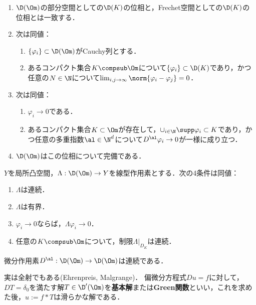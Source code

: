 \documentclass[uplatex,dvipdfmx]{jsreport}
\begin{document}
\begin{theorem}\mbox{}
    \begin{enumerate}
        \item $\D(\Om)$の部分空間としての$\D(K)$の位相と，Frechet空間としての$\D(K)$の位相とは一致する．
        \item 次は同値：
        \begin{enumerate}
            \item $\{\varphi_i\}\subset\D(\Om)$がCauchy列とする．
            \item あるコンパクト集合$K\compsub\Om$について$\{\varphi_i\}\subset\D(K)$であり，かつ任意の$N\in\N$について$\lim_{i,j\to\infty}\norm{\varphi_i-\varphi_j}=0$．
        \end{enumerate}
        \item 次は同値：
        \begin{enumerate}
            \item $\varphi_i\to0$である．
            \item あるコンパクト集合$K\subset\Om$が存在して，$\cup_{i\in\N}\supp\varphi_i\subset K$であり，かつ任意の多重指数$\al\in\N^d$について$D^\al\varphi_i\to0$が一様に成り立つ．
        \end{enumerate}
        \item $\D(\Om)$はこの位相について完備である．
    \end{enumerate}
\end{theorem}

\begin{theorem}[試験関数の空間上の線形作用素の連続性の特徴付け]
    $Y$を局所凸空間，$\Lambda:\D(\Om)\to Y$を線型作用素とする．次の4条件は同値：
    \begin{enumerate}
        \item $\Lambda$は連続．
        \item $\Lambda$は有界．
        \item $\varphi_i\to0$ならば，$\Lambda\varphi_i\to0$．
        \item 任意の$K\compsub\Om$について，制限$\Lambda|_{D_K}$は連続．
    \end{enumerate}
\end{theorem}
\begin{corollary}
    微分作用素$D^\al:\D(\Om)\to\D(\Om)$は連続である．
\end{corollary}
\begin{remarks}
    実は全射でもある(Ehrenpreis, Malgrange)．
    偏微分方程式$Du=f$に対して，
    $DT=\delta_0$を満たす解$T\in\D'(\Om)$を\textbf{基本解}または\textbf{Green関数}といい，これを求めた後，$u:=f*T$は滑らかな解である．
\end{remarks}
\end{document}
